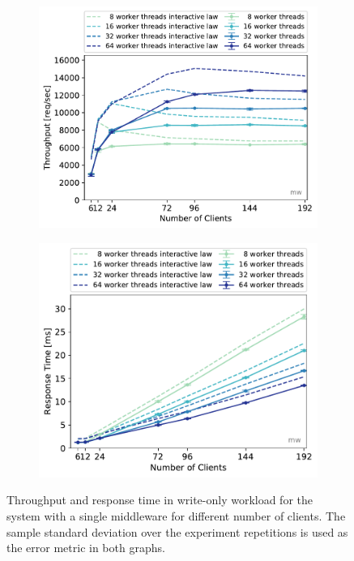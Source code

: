 \documentclass[report.tex]{subfiles}
\begin{document}
\begin{figure}
	\begin{subfigure}[b]{.499\linewidth}
		\centering
		\includegraphics[width=\linewidth]{data/exp31_wo_tp_nc_w.pdf}
	\end{subfigure}\hfill
	\begin{subfigure}[b]{.499\linewidth}
		\centering
		\includegraphics[width=\linewidth]{data/exp31_wo_rt_nc_w.pdf}
	\end{subfigure}
	\caption{Throughput and response time in write-only workload for the system with a single middleware for different number of clients. The sample standard deviation over the experiment repetitions is used as the error metric in both graphs.}\label{exp31_wo_tp_nc}
\end{figure}
\end{document}
